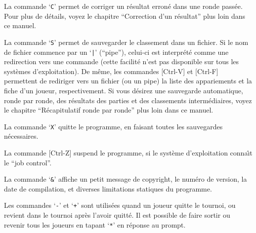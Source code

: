 \documentclass[10pt]{article}
\begin{document}
La commande `\verb|C|' permet de corriger un r\'esultat erron\'e dans 
une ronde pass\'ee.  Pour plus de d\'etails, voyez le chapitre 
``Correction d'un r\'esultat'' plus loin dans ce manuel.

La commande `\verb|S|' permet de sauvegarder le classement dans un 
fichier.  Si le nom de fichier commence par un `\verb.|.'  (``pipe''), 
celui-ci est interpr\'et\'e comme une redirection vers une commande 
(cette facilit\'e n'est pas disponible sur tous les syst\`emes 
d'exploitation).  De m\^eme, les commandes [Ctrl-V] et [Ctrl-F] 
permettent de rediriger vers un fichier (ou un pipe) la liste des 
appariements et la fiche d'un joueur, respectivement.  Si vous 
d\'esirez une sauvegarde automatique, ronde par ronde, des r\'esultats 
des parties et des classements interm\'ediaires, voyez le chapitre 
``R\'ecapitulatif ronde par ronde'' plus loin dans ce manuel.

	La commande `\verb|X|' quitte le programme, en faisant toutes les
sauvegardes n\'ecessaires.

	La commande [Ctrl-Z] suspend le programme, si le syst\`eme
d'exploitation conna{\^\i}t le ``job control''.

	La commande `\verb|&|' affiche un petit message de copyright, le
num\'ero de version, la date de compilation, et diverses limitations
statiques du programme.

	Les commandes `\verb|-|' et `\verb|+|' sont utilis\'ees quand un
joueur quitte le tournoi, ou revient dans le tournoi apr\`es l'avoir
quitt\'e.  Il est possible de faire sortir ou revenir tous les joueurs
en tapant `\verb|*|' en r\'eponse au prompt.  
\end{document}
